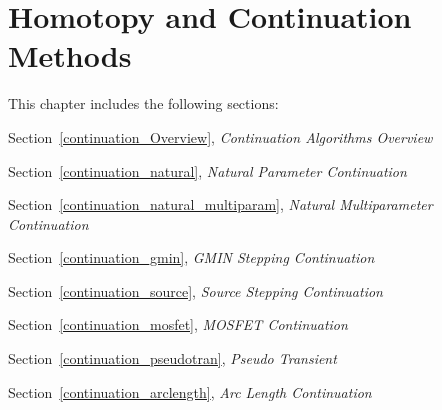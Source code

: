 



\chapter{Homotopy and Continuation Methods}
\label{Homotopy_Chap}


{
This chapter includes the following sections:
\begin{XyceItemize}
\item Section~\ref{continuation_Overview}, {\em Continuation Algorithms Overview}
\item Section~\ref{continuation_natural},  {\em Natural Parameter Continuation}
\item Section~\ref{continuation_natural_multiparam}, {\em Natural Multiparameter Continuation}

\item Section~\ref{continuation_gmin},    {\em GMIN Stepping Continuation}
\item Section~\ref{continuation_source},    {\em Source Stepping Continuation}
\item Section~\ref{continuation_mosfet},   {\em MOSFET Continuation}

\item Section~\ref{continuation_pseudotran}, {\em Pseudo Transient}
\item Section~\ref{continuation_arclength}, {\em Arc Length Continuation}
\end{XyceItemize}
}

